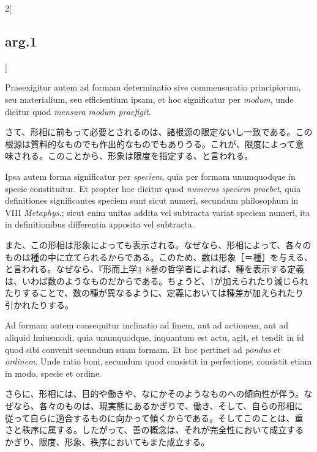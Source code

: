 \documentclass[paper=a4paper,fontsize=10pt,jafontsize=9pt,titlepage]{jlreq}
\begin{document}
\begin{paracol}{2}[\subsection{arg.1}]
\switchcolumn*

Praeexigitur autem ad formam determinatio sive commensuratio
 principiorum, seu materialium, seu efficientium ipsam, et hoc
 significatur per {\itshape modum}, unde dicitur quod {\itshape mensura modum praefigit}.

\switchcolumn

さて、形相に前もって必要とされるのは、諸根源の限定ないし一致である。この
 根源は質料的なものでも作出的なものでもありうる。これが、限度によって意
 味される。このことから、形象は限度を指定する、と言われる。

\switchcolumn*

Ipsa autem forma significatur per {\itshape speciem}, quia per formam unumquodque
 in specie constituitur. Et propter hoc dicitur quod {\itshape numerus speciem
 praebet}, quia definitiones significantes speciem sunt sicut numeri,
 secundum philosophum in VIII {\itshape Metaphys}.; sicut enim unitas addita vel
 subtracta variat speciem numeri, ita in definitionibus differentia
 apposita vel subtracta.

\switchcolumn

また、この形相は形象によっても表示される。なぜなら、形相によって、各々の
 ものは種の中に立てられるからである。このため、数は形象［＝種］を与える、
 と言われる。なぜなら、『形而上学』8巻の哲学者によれば、種を表示する定義
 は、いわば数のようなものだからである。ちょうど、1が加えられたり減じられ
 たりすることで、数の種が異なるように、定義においては種差が加えられたり
 引かれたりする。

\switchcolumn*

Ad formam autem consequitur inclinatio ad finem, aut ad actionem, aut ad
 aliquid huiusmodi, quia unumquodque, inquantum est actu, agit, et
 tendit in id quod sibi convenit secundum suam formam. Et hoc pertinet
 ad {\itshape pondus} et {\itshape ordinem}. Unde ratio boni, secundum quod consistit in
 perfectione, consistit etiam in modo, specie et ordine.

\switchcolumn

さらに、形相には、目的や働きや、なにかそのようなものへの傾向性が伴う。な
 ぜなら、各々のものは、現実態にあるかぎりで、働き、そして、自らの形相に
 従って自らに適合するものに向かって傾くからである。そしてこのことは、重
 さと秩序に属する。したがって、善の概念は、それが完全性において成立する
 かぎり、限度、形象、秩序においてもまた成立する。

\switchcolumn*[\subsection{ad.1}]


\end{paracol}
\end{document}
